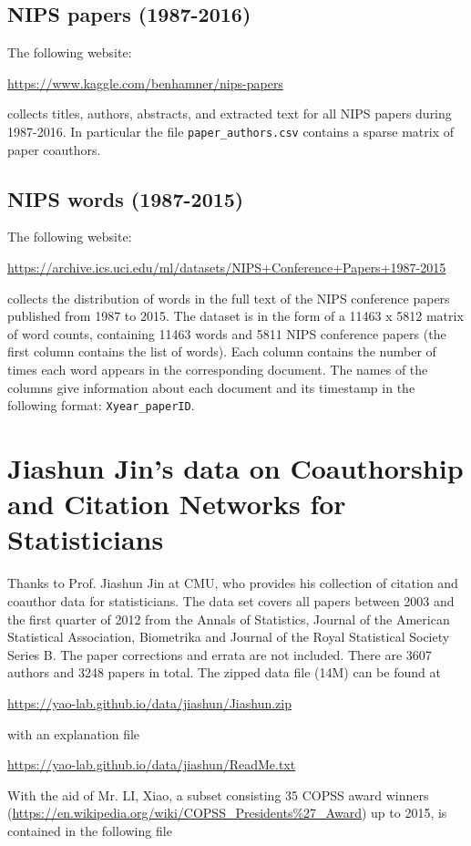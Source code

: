 \documentclass[11pt]{article}
\begin{document}
\subsection{NIPS papers (1987-2016)} The following website: 

\url{https://www.kaggle.com/benhamner/nips-papers}

\noindent collects titles, authors, abstracts, and extracted text for all NIPS papers during 1987-2016. In particular the file {\texttt{paper\_authors.csv}} contains a sparse matrix of paper coauthors. 

\subsection{NIPS words (1987-2015)} The following website:

\url{https://archive.ics.uci.edu/ml/datasets/NIPS+Conference+Papers+1987-2015}

\noindent collects the distribution of words in the full text of the NIPS conference papers published from 1987 to 2015. The dataset is in the form of a 11463 x 5812 matrix of word counts, containing 11463 words and 5811 NIPS conference papers (the first column contains the list of words). Each column contains the number of times each word appears in the corresponding document. The names of the columns give information about each document and its timestamp in the following format: {\texttt{Xyear\_paperID}}. 


\section{Jiashun Jin's data on Coauthorship and Citation Networks for Statisticians}
Thanks to Prof. Jiashun Jin at CMU, who provides his collection of citation and coauthor data for statisticians. The data set covers all papers between 2003 and the first quarter of 2012 from the Annals of Statistics, Journal of the American Statistical Association, Biometrika and Journal of the Royal Statistical Society Series B. The paper corrections and errata are not included. There are 3607 authors and 3248 papers in total. The zipped data file (14M) can be found at 

\url{https://yao-lab.github.io/data/jiashun/Jiashun.zip}

\noindent with an explanation file

\url{https://yao-lab.github.io/data/jiashun/ReadMe.txt}

With the aid of Mr. LI, Xiao, a subset consisting 35 COPSS award winners (\url{https://en.wikipedia.org/wiki/COPSS_Presidents\%27_Award}) up to 2015, is contained in the following file
\end{document}
